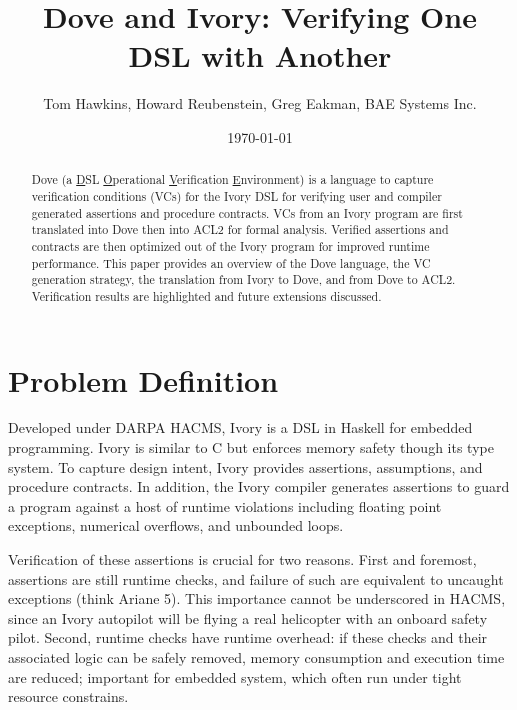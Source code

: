 \documentclass{article}
\begin{document}
\title{Dove and Ivory: Verifying One DSL with Another}
\author{Tom Hawkins, Howard Reubenstein, Greg Eakman, BAE Systems Inc.}
\date{\today}
\maketitle

\begin{abstract}
Dove (a \underline{D}SL \underline{O}perational \underline{V}erification \underline{E}nvironment)
is a language to capture verification conditions (VCs) for the 
Ivory DSL for verifying user and compiler generated assertions
and procedure contracts.  VCs from an Ivory program are first
translated into Dove then into ACL2 for formal analysis.
Verified assertions and contracts are then optimized out of
the Ivory program for improved runtime performance.
This paper provides an overview of the Dove language,
the VC generation strategy, the translation from Ivory to Dove,
and from Dove to ACL2.  Verification results are highlighted
and future extensions discussed.
\end{abstract}


\section{Problem Definition}

Developed under DARPA HACMS, Ivory is a DSL in Haskell for 
embedded programming.  Ivory is similar to C but
enforces memory safety though its type system.
To capture design intent, Ivory provides
assertions, assumptions, and procedure contracts.
In addition, the Ivory compiler generates
assertions to guard a program against a host of runtime violations including
floating point exceptions, numerical overflows, and unbounded loops.

Verification of these assertions is crucial for two reasons.  First and foremost,
assertions are still runtime checks, and failure of such are equivalent 
to uncaught exceptions (think Ariane 5).  This importance cannot
be underscored in HACMS, since an Ivory autopilot will be flying a real helicopter
with an onboard safety pilot.  Second, runtime checks have
runtime overhead: if these checks and their associated logic can be safely
removed, memory consumption and execution time are reduced; important 
for embedded system, which often run under tight resource constrains.
\end{document}
